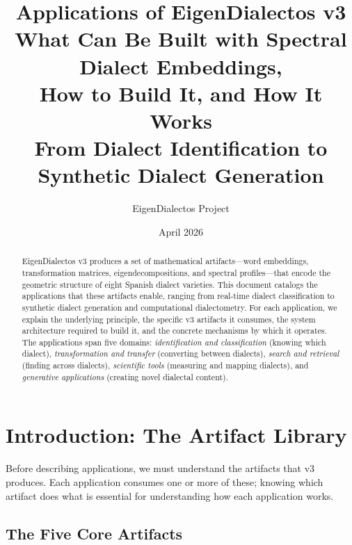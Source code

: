 \documentclass[11pt,a4paper]{article}
\title{%
  \textbf{Applications of EigenDialectos v3}\\[0.3em]
  \Large What Can Be Built with Spectral Dialect Embeddings,\\
  How to Build It, and How It Works\\[0.5em]
  \large From Dialect Identification to Synthetic Dialect Generation
}
\author{EigenDialectos Project}
\date{April 2026}
\begin{document}
\maketitle
\thispagestyle{empty}

\begin{abstract}
EigenDialectos v3 produces a set of mathematical artifacts---word
embeddings, transformation matrices, eigendecompositions, and
spectral profiles---that encode the geometric structure of eight
Spanish dialect varieties. This document catalogs the applications
that these artifacts enable, ranging from real-time dialect
classification to synthetic dialect generation and computational
dialectometry. For each application, we explain the underlying
principle, the specific v3 artifacts it consumes, the system
architecture required to build it, and the concrete mechanisms by
which it operates. The applications span five domains:
\emph{identification and classification} (knowing which dialect),
\emph{transformation and transfer} (converting between dialects),
\emph{search and retrieval} (finding across dialects),
\emph{scientific tools} (measuring and mapping dialects), and
\emph{generative applications} (creating novel dialectal content).
\end{abstract}

\tableofcontents
\newpage

\section{Introduction: The Artifact Library}
\label{sec:artifacts}

Before describing applications, we must understand the artifacts that
v3 produces. Each application consumes one or more of these; knowing
which artifact does what is essential for understanding how each
application works.

\subsection{The Five Core Artifacts}
\end{document}
